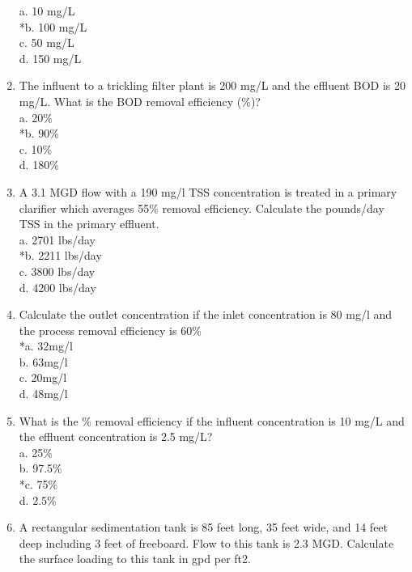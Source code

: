 \documentclass{article}
\begin{document}
\begin{enumerate}
a. 10 mg/L \\
*b. 100 mg/L \\
c. 50 mg/L \\
d. 150 mg/L \\

\item The influent to a trickling filter plant is 200 mg/L and the effluent BOD is 20 mg/L. What is the BOD removal efficiency (\%)? \\

a. 20\% \\
*b. 90\% \\
c. 10\% \\
d. 180\% \\

\item A 3.1 MGD flow with a 190 mg/l TSS concentration is treated in a primary clarifier which averages 55\% removal efficiency. Calculate the pounds/day TSS in the primary effluent. \\

a. 2701 lbs/day \\
*b. 2211 lbs/day \\
c. 3800 lbs/day \\
d. 4200 lbs/day \\

\item Calculate the outlet concentration if the inlet concentration is 80 mg/l and the process removal efficiency is 60\% \\

*a. 32mg/l \\
b. 63mg/l \\
c. 20mg/l \\
d. 48mg/l \\

\item What is the \% removal efficiency if the influent concentration is 10 mg/L and the effluent concentration is 2.5 mg/L? \\

a. 25\% \\
b. 97.5\% \\
*c. 75\% \\
d. 2.5\% \\

\item A rectangular sedimentation tank is 85 feet long, 35 feet wide, and 14 feet deep including 3 feet of freeboard. Flow to this tank is 2.3 MGD. Calculate the surface loading to this tank in gpd per ft2. \\


\end{enumerate}
\end{document}
